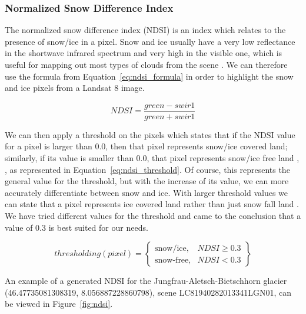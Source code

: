 \documentclass[12pt, a4paper]{report}
\begin{document}
	
	\subsubsection{Normalized Snow Difference Index}
	\label{seq:ndsi_functional}
	
	\par The normalized snow difference index (NDSI) is an index which relates to the presence of snow/ice in a pixel. Snow and ice usually have a very low reflectance in the shortwave infrared spectrum and very high in the visible one, which is useful for mapping out most types of clouds from the scene \cite{ndsi}. We can therefore use the formula from Equation~\ref{eq:ndsi_formula} in order to highlight the snow and ice pixels from a Landsat 8 image.
	
	\begin{equation}\label{eq:ndsi_formula}
		NDSI = \frac{green - swir1}{green + swir1}
	\end{equation}

	\par We can then apply a threshold on the pixels which states that if the NDSI value for a pixel is larger than 0.0, then that pixel represents snow/ice covered land; similarly, if its value is smaller than 0.0, that pixel represents snow/ice free land \cite{ndsi}, \cite{viirs}, as represented in Equation~\ref{eq:ndsi_threshold}. Of course, this represents the general value for the threshold, but with the increase of its value, we can more accurately differentiate between snow and ice. With larger threshold values we can state that a pixel represents ice covered land rather than just snow fall land \cite{viirs}. We have tried different values for the threshold and came to the conclusion that a value of 0.3 is best suited for our needs.
	
	\begin{equation}
		thresholding(pixel) = \left.
		\begin{cases}\label{eq:ndsi_threshold}
			
			\text{snow/ice},  & NDSI \geq 0.3\\
			\text{snow-free}, & NDSI < 0.3
		\end{cases}
		\right\}
	\end{equation}

	\par An example of a generated NDSI for the Jungfrau-Aletsch-Bietschhorn glacier (46.47735081308319, 8.056887228860798), scene LC81940282013341LGN01, can be viewed in Figure~\ref{fig:ndsi}.
	
\end{document}
